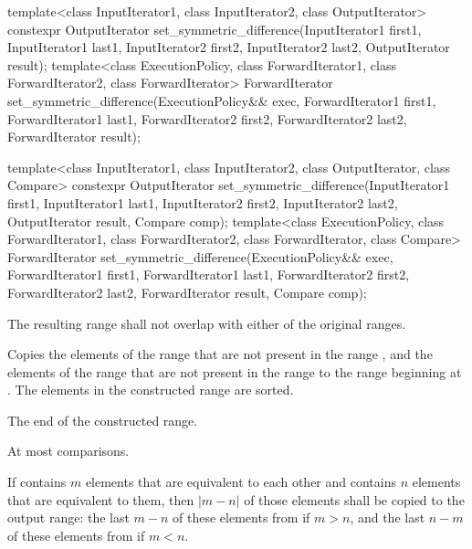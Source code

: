 %
\begin{itemdecl}
template<class InputIterator1, class InputIterator2,
         class OutputIterator>
  constexpr OutputIterator
    set_symmetric_difference(InputIterator1 first1, InputIterator1 last1,
                             InputIterator2 first2, InputIterator2 last2,
                             OutputIterator result);
template<class ExecutionPolicy, class ForwardIterator1, class ForwardIterator2,
         class ForwardIterator>
  ForwardIterator
    set_symmetric_difference(ExecutionPolicy&& exec,
                             ForwardIterator1 first1, ForwardIterator1 last1,
                             ForwardIterator2 first2, ForwardIterator2 last2,
                             ForwardIterator result);

template<class InputIterator1, class InputIterator2,
         class OutputIterator, class Compare>
  constexpr OutputIterator
    set_symmetric_difference(InputIterator1 first1, InputIterator1 last1,
                             InputIterator2 first2, InputIterator2 last2,
                             OutputIterator result, Compare comp);
template<class ExecutionPolicy, class ForwardIterator1, class ForwardIterator2,
         class ForwardIterator, class Compare>
  ForwardIterator
    set_symmetric_difference(ExecutionPolicy&& exec,
                             ForwardIterator1 first1, ForwardIterator1 last1,
                             ForwardIterator2 first2, ForwardIterator2 last2,
                             ForwardIterator result, Compare comp);
\end{itemdecl}

\begin{itemdescr}
\pnum
\requires
The resulting range shall not overlap with either of the original ranges.

\pnum
\effects
Copies the elements of the range
that are not present in the range
,
and the elements of the range
that are not present in the range
to the range beginning at
.
The elements in the constructed range are sorted.

\pnum
\returns
The end of the constructed range.

\pnum
\complexity
At most
comparisons.

\pnum
\remarks
If  contains $m$ elements that are equivalent to each other and
 contains $n$ elements that are equivalent to them, then
$|m - n|$ of those elements shall be copied to the output range: the last
$m - n$ of these elements from  if $m > n$, and the last
$n - m$ of these elements from  if $m < n$.
\end{itemdescr}

